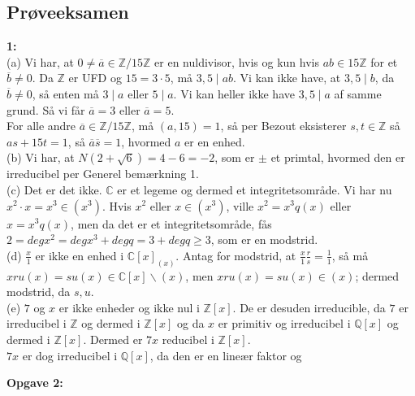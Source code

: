 \documentclass[a4paper]{article}
\begin{document}
\subsection{Prøveeksamen}

\textbf{1:}\\
(a) Vi har, at $0\neq \overline{a} \in \mathbb{Z}/15\mathbb{Z}$ er en nuldivisor, hvis og kun
hvis $ab \in 15\mathbb{Z}$ for et $\overline{b}\neq 0$. Da $\mathbb{Z}$ er UFD
og $15 = 3 \cdot 5$, må $3,5  \mid ab$. Vi kan ikke have, at $3,5  \mid b$, da
 $\overline{b}\neq 0$, så enten må $3  \mid a$ eller $5 \mid a$. Vi kan heller
 ikke have $3,5 \mid a$ af samme grund. Så vi får
 $\overline{a} = 3$ eller $\overline{a}=5$.\\
 For alle andre $\overline{a} \in \mathbb{Z}/15\mathbb{Z}$, må $(a,15)=1$, så
 per Bezout eksisterer $s,t \in \mathbb{Z}$ så $as+15t = 1$, så
 $\overline{a} \overline{s}=1$, hvormed $a$ er en enhed.\\
 \linebreak
 (b) Vi har, at $N ( 2+ \sqrt{6} ) = 4 - 6 = -2$, som er $\pm$ et primtal,
 hvormed den er irreducibel per Generel bemærkning 1.\\
 \linebreak
 (c) Det er det ikke. $\mathbb{C}$ er et legeme og dermed et integritetsområde.
 Vi har nu $x^2 \cdot x = x^3 \in (x^3)$. Hvis $x^2$ eller $x \in (x^3)$, ville
 $x^2 = x^3 q(x)$ eller $x = x^3 q(x)$, men da det er et integritetsområde, fås
 $2 = deg x^2 = deg x^3 + deg q = 3 + deg q \ge 3$, som er en modstrid.\\
 \linebreak
 (d) $\frac{x}{1}$ er ikke en enhed i $\mathbb{C}[x]_{(x)}$. Antag for
 modstrid, at
 $\frac{x}{1} \frac{r}{s} = \frac{1}{1}$, så må $xr u(x) = s u(x) \in
 \mathbb{C}[x] \backslash (x)$, men $x r u(x) = s u(x) \in (x)$; dermed
 modstrid, da $s, u $.\\
 \linebreak
 (e) $7$ og $x$ er ikke enheder og ikke nul i $\mathbb{Z}[x]$. De er desuden
 irreducible, da $7$ er irreducibel i $\mathbb{Z}$ og dermed i $\mathbb{Z}[x]$ 
 og
 da $x$ er primitiv og irreducibel i $\mathbb{Q}[x]$ og dermed
 i $\mathbb{Z}[x]$. Dermed er $7x$ reducibel i $\mathbb{Z}[x]$.\\
 $7x$ er dog irreducibel i $\mathbb{Q}[x]$, da den er en lineær faktor og

 \textbf{Opgave 2:}
\end{document}

